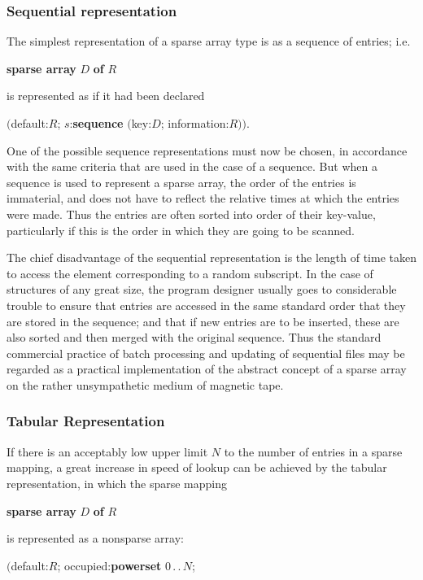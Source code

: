 \subsubsection{Sequential representation}

The simplest representation of a sparse array type is as a sequence of entries;
i.e.

\quad \textbf{sparse array} $D$ \textbf{of} $R$

\noindent
is represented as if it had been declared

\quad $($default:$R$; $s$:\textbf{sequence} $($key:$D$; information:$R))$.

One of the possible sequence representations must now be chosen, in accordance with the same criteria that are used in the case of a sequence. But when a sequence is used to represent a sparse array, the order of the entries is immaterial, and does not have to reflect the relative times at which the entries were made. Thus the entries are often sorted into order of their
key-value, particularly if this is the order in which they are going to be scanned.

The chief disadvantage of the sequential representation is the length of time taken to access the element corresponding to a random subscript. In the case of structures of any great size, the program designer usually goes to considerable trouble to ensure that entries are accessed in the same standard order that they are stored in the sequence; and that if new entries are to be inserted, these are also sorted and then merged with the original sequence. Thus the standard commercial practice of batch processing and updating of sequential files may be regarded as a practical implementation of the abstract concept of a sparse array on the rather unsympathetic medium of magnetic tape.

\subsubsection{Tabular Representation}

If there is an acceptably low upper limit $N$ to the number of entries in a sparse mapping, a great increase in speed of lookup can be achieved by the tabular representation, in which the sparse mapping

\quad \textbf{sparse array} $D$ \textbf{of} $R$

\noindent
is represented as a nonsparse array:

\quad $($default:$R$; occupied:\textbf{powerset} $0\,.\,.\,N$;

